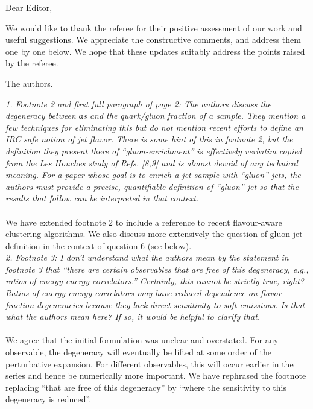 \documentclass[a4paper,11pt]{article}
\begin{document}
%
\vspace{0.3cm}

\noindent Dear Editor, 
\vspace{0.3cm}

We would like to thank the referee for their positive assessment of our work and useful suggestions. We appreciate the constructive comments, and address them one by one below. We hope that these updates suitably address the points raised by the referee.

\vspace{0.3cm}
\noindent The authors.

\vspace{0.6cm}

\vspace{0.3cm}

\noindent \textit{1. Footnote 2 and first full paragraph of page 2:
The authors discuss the degeneracy between αs and the quark/gluon fraction of a sample. They mention a few techniques for eliminating this but do not mention recent efforts to define an IRC safe notion of jet flavor. There is some hint of this in footnote 2, but the definition they present there of “gluon-enrichment” is effectively verbatim copied from the Les Houches study of Refs. [8,9] and is almost devoid of any technical meaning. For a paper whose goal is to enrich a jet sample with “gluon” jets, the authors must provide a precise, quantifiable definition of “gluon” jet so that the results that follow can be interpreted in that context.}
\\
\\
We have extended footnote 2 to include a reference to recent flavour-aware clustering algorithms. We also discuss more extensively the question of gluon-jet definition in the context of question 6 (see below).
\\

\noindent \textit{2. Footnote 3: I don’t understand what the authors mean by the statement in footnote 3 that “there are certain observables that are free of this degeneracy, e.g., ratios of energy-energy correlators.” Certainly, this cannot be strictly true, right? Ratios of energy-energy correlators may have reduced dependence on flavor fraction degeneracies because they lack direct sensitivity to soft emissions. Is that what the authors mean here? If so, it would be helpful to clarify that.
}
\\
\\
We agree that the initial formulation was unclear and overstated. For any observable, the degeneracy will eventually be lifted at some order of the perturbative expansion. For different observables, this will occur earlier in the series and hence be numerically more important. We have rephrased the footnote replacing “that are free of this degeneracy” by “where the sensitivity to this degeneracy is reduced”.
\\
\end{document}
